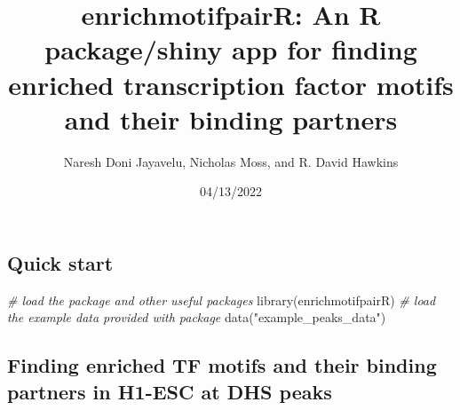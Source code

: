 \documentclass[
]{article}
\title{enrichmotifpairR: An R package/shiny app for finding enriched
transcription factor motifs and their binding partners}
\author{Naresh Doni Jayavelu, Nicholas Moss, and R. David Hawkins}
\date{04/13/2022}
\newenvironment{Shaded}{}{}
\newcommand{\AttributeTok}[1]{\textcolor[rgb]{0.49,0.56,0.16}{#1}}
\newcommand{\CommentTok}[1]{\textcolor[rgb]{0.38,0.63,0.69}{\textit{#1}}}
\newcommand{\FloatTok}[1]{\textcolor[rgb]{0.25,0.63,0.44}{#1}}
\newcommand{\FunctionTok}[1]{\textcolor[rgb]{0.02,0.16,0.49}{#1}}
\newcommand{\NormalTok}[1]{#1}
\newcommand{\OtherTok}[1]{\textcolor[rgb]{0.00,0.44,0.13}{#1}}
\newcommand{\SpecialCharTok}[1]{\textcolor[rgb]{0.25,0.44,0.63}{#1}}
\newcommand{\StringTok}[1]{\textcolor[rgb]{0.25,0.44,0.63}{#1}}
\begin{document}
\maketitle

{
\setcounter{tocdepth}{2}
\tableofcontents
}
\hypertarget{quick-start}{%
\subsection{Quick start}\label{quick-start}}

\begin{Shaded}
\begin{Highlighting}[]
\CommentTok{\# load the package and other useful packages}
\FunctionTok{library}\NormalTok{(enrichmotifpairR)}
\CommentTok{\# load the example data provided with package}
\FunctionTok{data}\NormalTok{(}\StringTok{"example\_peaks\_data"}\NormalTok{)}
\end{Highlighting}
\end{Shaded}

\hypertarget{finding-enriched-tf-motifs-and-their-binding-partners-in-h1-esc-at-dhs-peaks}{%
\subsection{Finding enriched TF motifs and their binding partners in
H1-ESC at DHS
peaks}\label{finding-enriched-tf-motifs-and-their-binding-partners-in-h1-esc-at-dhs-peaks}}

\begin{Shaded}
\end{Shaded}
\end{document}
